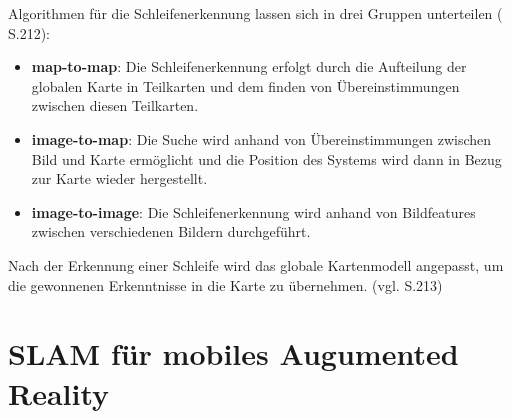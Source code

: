 Algorithmen für die Schleifenerkennung lassen sich in drei Gruppen unterteilen (\cite{loop_closure} S.212):

\begin{itemize}
\item \textbf{map-to-map}: Die Schleifenerkennung erfolgt durch die Aufteilung der globalen Karte in Teilkarten und dem finden von Übereinstimmungen zwischen diesen Teilkarten.

\item \textbf{image-to-map}: Die Suche wird anhand von Übereinstimmungen zwischen Bild und Karte ermöglicht und die Position des Systems wird dann in Bezug zur Karte wieder hergestellt.

\item \textbf{image-to-image}: Die Schleifenerkennung wird anhand von Bildfeatures zwischen verschiedenen Bildern durchgeführt.

\end{itemize}
Nach der Erkennung einer Schleife wird das globale Kartenmodell angepasst, um die gewonnenen Erkenntnisse in die Karte zu übernehmen. (vgl. \cite{loop_closure} S.213)

\section{SLAM für mobiles Augumented Reality}

